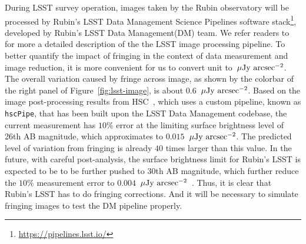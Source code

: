 \documentclass[twocolumn]{aastex63} %
\newcommand{\ujyac}{$\mu\rm{Jy}\ \rm{arcsec}^{-2}$}
\begin{document}
\begin{CJK*}{UTF8}{gbsn}
During LSST survey operation, images taken by the Rubin observatory will be processed by Rubin's LSST Data Management Science Pipelines software stack\footnote{\url{https://pipelines.lsst.io/}}, developed by Rubin's LSST Data Management(DM) team. We refer readers to ~\citet{Bos18,Bosch19} for more a detailed description of the the LSST image processing pipeline. To better quantify the impact of fringing in the context of data measurement and image reduction, it is more convenient for us to convert unit to~\ujyac. The overall variation caused by fringe across image, as shown by the colorbar of the right panel of Figure~\ref{fig:lsst-image}, is about 0.6~\ujyac.
Based on the image post-processing results from HSC~\citep{Aihara19,Aihara22}, which uses a custom pipeline, known as \verb|hscPipe|, that has been built upon the LSST Data Management codebase, the current measurement has $10\%$ error at the limiting surface brightness level of 26th AB magnitude, which approximates to $0.015$~\ujyac. The predicted level of variation from fringing is already $40$ times larger than this value. In the future, with careful post-analysis, the surface brightness limit for Rubin's LSST is expected to be to be further pushed to 30th AB magnitude, which further reduce the $10\%$ measurement error to $0.004$~\ujyac~\citep{rlh}.  Thus, it is clear that Rubin's LSST has to do fringing corrections. And it will be necessary to simulate fringing images to test the DM pipeline properly.


\end{CJK*}
\end{document}
